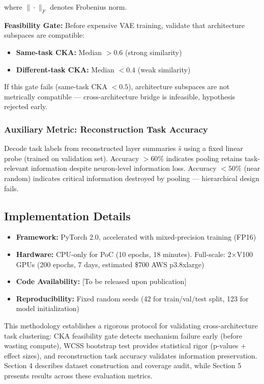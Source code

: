 where $\| \cdot \|_F$ denotes Frobenius norm.

\textbf{Feasibility Gate:} Before expensive VAE training, validate that architecture subspaces are compatible:

\begin{itemize}
\item \textbf{Same-task CKA:} Median $> 0.6$ (strong similarity)
\item \textbf{Different-task CKA:} Median $< 0.4$ (weak similarity)
\end{itemize}

If this gate fails (same-task CKA $< 0.5$), architecture subspaces are not metrically compatible --- cross-architecture bridge is infeasible, hypothesis rejected early.

\subsubsection{Auxiliary Metric: Reconstruction Task Accuracy}

Decode task labels from reconstructed layer summaries $\hat{s}$ using a fixed linear probe (trained on validation set). Accuracy $> 60\%$ indicates pooling retains task-relevant information despite neuron-level information loss. Accuracy $< 50\%$ (near random) indicates critical information destroyed by pooling --- hierarchical design fails.

\subsection{Implementation Details}

\begin{itemize}
\item \textbf{Framework:} PyTorch 2.0, accelerated with mixed-precision training (FP16)
\item \textbf{Hardware:} CPU-only for PoC (10 epochs, 18 minutes). Full-scale: 2$\times$V100 GPUs (200 epochs, 7 days, estimated \$700 AWS p3.8xlarge)
\item \textbf{Code Availability:} [To be released upon publication]
\item \textbf{Reproducibility:} Fixed random seeds (42 for train/val/test split, 123 for model initialization)
\end{itemize}

This methodology establishes a rigorous protocol for validating cross-architecture task clustering: CKA feasibility gate detects mechanism failure early (before wasting compute), WCSS bootstrap test provides statistical rigor (p-values + effect sizes), and reconstruction task accuracy validates information preservation. Section 4 describes dataset construction and coverage audit, while Section 5 presents results across these evaluation metrics.
